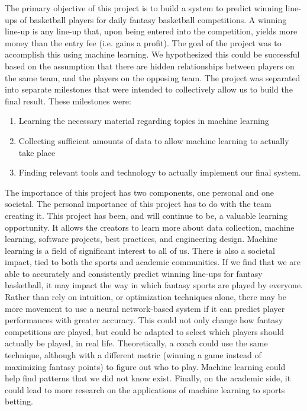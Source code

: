 
The primary objective of this project is to build a system to predict winning line-ups of basketball players for daily fantasy basketball competitions. A winning line-up is any line-up that, upon being entered into the competition, yields more money than the entry fee (i.e. gains a profit). The goal of the project was to  accomplish this using machine learning. We hypothesized this could be successful based on the assumption that there are hidden relationships between players on the same team, and the players on the opposing team. The project was separated into separate milestones that were intended to collectively allow us to build the final result. These milestones were:
\begin{enumerate}
\item{Learning the necessary material regarding topics in machine learning}
\item{Collecting sufficient amounts of data to allow machine learning to actually take place}
\item{Finding relevant tools and technology to actually implement our final system.}
\end{enumerate}
The importance of this project has two components, one personal and one societal. The personal importance of this project has to do with the team creating it. This project has been, and will continue to be, a valuable learning opportunity. It allows the creators to learn more about data collection, machine learning, software projects, best practices, and engineering design. Machine learning is a field of significant interest to all of us. There is also a societal impact, tied to both the sports and academic communities. If we find that we are able to accurately and consistently predict winning line-ups for fantasy basketball, it may impact the way in which fantasy sports are played by everyone. Rather than rely on intuition, or optimization techniques alone, there may be more movement to use a neural network-based system if it can predict player performances with greater accuracy. This could not only change how fantasy competitions are played, but could be adapted to select which players should actually be played, in real life. Theoretically, a coach could use the same technique, although with a different metric (winning a game instead of maximizing fantasy points) to figure out who to play. Machine learning could help find patterns that we did not know exist. Finally, on the academic side, it could lead to more research on the applications of machine learning to sports betting.
